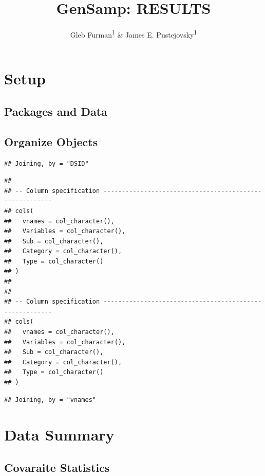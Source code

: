 \documentclass[
  english,
  man,floatsintext]{apa6}
\title{GenSamp: RESULTS}
\author{Gleb Furman\textsuperscript{1} \& James E. Pustejovsky\textsuperscript{1}}
\date{}
\affiliation{\vspace{0.5cm}\textsuperscript{1} University of Texas at Austin}
\begin{document}
\maketitle

\hypertarget{setup}{%
\section{Setup}\label{setup}}

\hypertarget{packages-and-data}{%
\subsection{Packages and Data}\label{packages-and-data}}

\hypertarget{organize-objects}{%
\subsection{Organize Objects}\label{organize-objects}}

\begin{verbatim}
## Joining, by = "DSID"
\end{verbatim}

\begin{verbatim}
## 
## -- Column specification --------------------------------------------------------
## cols(
##   vnames = col_character(),
##   Variables = col_character(),
##   Sub = col_character(),
##   Category = col_character(),
##   Type = col_character()
## )
## 
## 
## -- Column specification --------------------------------------------------------
## cols(
##   vnames = col_character(),
##   Variables = col_character(),
##   Sub = col_character(),
##   Category = col_character(),
##   Type = col_character()
## )
\end{verbatim}

\begin{verbatim}
## Joining, by = "vnames"
\end{verbatim}

\hypertarget{data-summary}{%
\section{Data Summary}\label{data-summary}}

\hypertarget{covaraite-statistics}{%
\subsection{Covaraite Statistics}\label{covaraite-statistics}}
\end{document}
